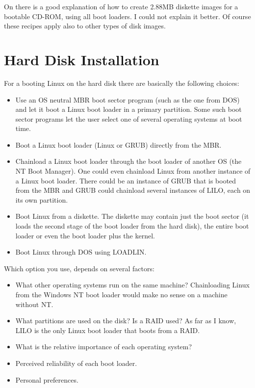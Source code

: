 \documentclass[12pt,a4paper]{article}
\begin{document}
On
there is a good explanation of how to create 2.88MB diskette images
for a bootable CD-ROM, using all boot loaders. I could not explain it
better. Of course these recipes apply also to other types of disk images.

\section{Hard Disk Installation}

For a booting Linux on the hard disk there are basically the following
choices:
\begin{itemize}
\item Use an OS neutral MBR boot sector program (such as the one from
  DOS) and let it boot a Linux boot loader in a primary
  partition. Some such boot sector programs let the user select one of
  several operating systems at boot time.
\item Boot a Linux boot loader (Linux or GRUB) directly from the MBR.
\item Chainload a Linux boot loader through the boot loader of another
  OS (the NT Boot Manager). One could even chainload Linux from
  another instance of a Linux boot loader. There could be an instance
  of GRUB that is booted from the MBR and GRUB could chainload several
  instances of LILO, each on its own partition.
\item Boot Linux from a diskette. The diskette may contain just the
  boot sector (it loads the second stage of the boot loader from the
  hard disk), the entire boot loader or even the boot loader plus the
  kernel. 
\item Boot Linux through DOS using LOADLIN.
\end{itemize}

Which option you use, depends on several factors:
\begin{itemize}
\item What other operating systems run on the same
  machine? Chainloading Linux from the Windows NT boot loader would
  make no sense on a machine without NT.
\item What partitions are used on the disk? Is a RAID used? As far as
  I know, LILO is the only Linux boot loader that boots from a RAID.
\item What is the relative importance of each operating system?
\item Perceived reliability of each boot loader.
\item Personal preferences.
\end{itemize}
\end{document}
